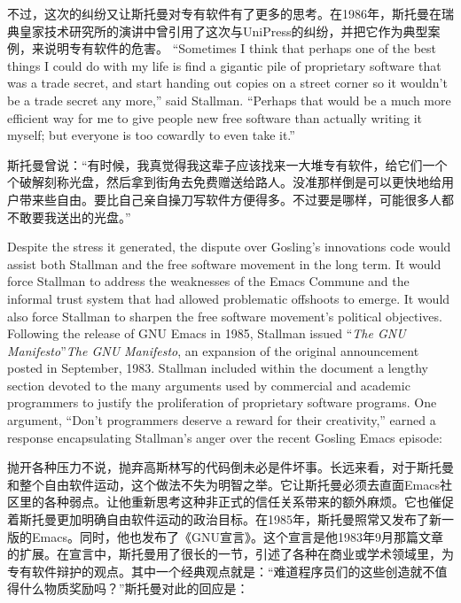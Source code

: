\ifdefined\chs
不过，这次的纠纷又让斯托曼对专有软件有了更多的思考。在1986年，斯托曼在瑞典皇家技术研究所的演讲中曾引用了这次与UniPress的纠纷，并把它作为典型案例，来说明专有软件的危害。
\fi
\fi
\ifdefined\eng
``Sometimes I think that perhaps one of the best things I could do with my life is find a gigantic pile of proprietary software that was a trade secret, and start handing out copies on a street corner so it wouldn't be a trade secret any more,'' said Stallman. ``Perhaps that would be a much more efficient way for me to give people new free software than actually writing it myself; but everyone is too cowardly to even take it.''
\fi

\ifdefined\chs
斯托曼曾说：``有时候，我真觉得我这辈子应该找来一大堆专有软件，给它们一个个破解刻称光盘，然后拿到街角去免费赠送给路人。没准那样倒是可以更快地给用户带来些自由。要比自己亲自操刀写软件方便得多。不过要是哪样，可能很多人都不敢要我送出的光盘。''
\fi

\ifdefined\eng
Despite the stress it generated, the dispute over Gosling's \ifdefined\vone innovations \fi\ifdefined\vtwo code \fi would assist both Stallman and the free software movement in the long term. It would force Stallman to address the weaknesses of the Emacs Commune and the informal trust system that had allowed problematic offshoots to emerge. It would also force Stallman to sharpen the free software movement's political objectives. Following the release of GNU Emacs in 1985, Stallman issued \ifdefined\vone ``\textit{The GNU Manifesto}''\fi\ifdefined\vtwo \textit{The GNU Manifesto}\fi, an expansion of the original announcement posted in September, 1983. Stallman included within the document a lengthy section devoted to the many arguments used by commercial and academic programmers to justify the proliferation of proprietary software programs. One argument, ``Don't programmers deserve a reward for their creativity,'' earned a response encapsulating Stallman's anger over the recent Gosling Emacs episode:
\fi

\ifdefined\chs
抛开各种压力不说，抛弃高斯林写的代码倒未必是件坏事。长远来看，对于斯托曼和整个自由软件运动，这个做法不失为明智之举。它让斯托曼必须去直面Emacs社区里的各种弱点。让他重新思考这种非正式的信任关系带来的额外麻烦。它也催促着斯托曼更加明确自由软件运动的政治目标。在1985年，斯托曼照常又发布了新一版的Emacs。同时，他也发布了《GNU宣言》。这个宣言是他1983年9月那篇文章的扩展。在宣言中，斯托曼用了很长的一节，引述了各种在商业或学术领域里，为专有软件辩护的观点。其中一个经典观点就是：``难道程序员们的这些创造就不值得什么物质奖励吗？''斯托曼对此的回应是：
\fi

